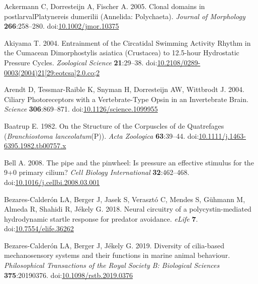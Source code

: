 \documentclass[
  11pt,
]{article}
\newlength{\cslhangindent}
\newenvironment{CSLReferences}[2] %
 {\begin{list}{}{%
  \setlength{\itemindent}{0pt}
  \setlength{\leftmargin}{0pt}
  \setlength{\parsep}{0pt}
  \ifodd #1
   \setlength{\leftmargin}{\cslhangindent}
   \setlength{\itemindent}{-1\cslhangindent}
  \fi
  \setlength{\itemsep}{#2\baselineskip}}}
 {\end{list}}
\begin{document}
\label{refs}
\begin{CSLReferences}{1}{0}
Ackermann C, Dorresteijn A, Fischer A. 2005. Clonal domains in
postlarvalPlatynereis dumerilii (Annelida: Polychaeta). \emph{Journal of
Morphology} \textbf{266}:258--280.
doi:\href{https://doi.org/10.1002/jmor.10375}{10.1002/jmor.10375}

Akiyama T. 2004. Entrainment of the Circatidal Swimming Activity Rhythm
in the Cumacean Dimorphostylis asiatica (Crustacea) to 12.5-hour
Hydrostatic Pressure Cycles. \emph{Zoological Science}
\textbf{21}:29--38.
doi:\href{https://doi.org/10.2108/0289-0003(2004)21\%5B29:eotcsa\%5D2.0.co;2}{10.2108/0289-0003(2004)21{[}29:eotcsa{]}2.0.co;2}

Arendt D, Tessmar-Raible K, Snyman H, Dorresteijn AW, Wittbrodt J. 2004.
Ciliary Photoreceptors with a Vertebrate-Type Opsin in an Invertebrate
Brain. \emph{Science} \textbf{306}:869--871.
doi:\href{https://doi.org/10.1126/science.1099955}{10.1126/science.1099955}

Baatrup E. 1982. On the Structure of the Corpuscles of de Quatrefages
({\emph{Branchiostoma lanceolatum}}(P)). \emph{Acta Zoologica}
\textbf{63}:39--44.
doi:\href{https://doi.org/10.1111/j.1463-6395.1982.tb00757.x}{10.1111/j.1463-6395.1982.tb00757.x}

Bell A. 2008. The pipe and the pinwheel: Is pressure an effective
stimulus for the 9+0 primary cilium? \emph{Cell Biology International}
\textbf{32}:462--468.
doi:\href{https://doi.org/10.1016/j.cellbi.2008.03.001}{10.1016/j.cellbi.2008.03.001}

Bezares-Calderón LA, Berger J, Jasek S, Verasztó C, Mendes S, Gühmann M,
Almeda R, Shahidi R, Jékely G. 2018. Neural circuitry of a
polycystin-mediated hydrodynamic startle response for predator
avoidance. \emph{eLife} \textbf{7}.
doi:\href{https://doi.org/10.7554/elife.36262}{10.7554/elife.36262}

Bezares-Calderón LA, Berger J, Jékely G. 2019. Diversity of cilia-based
mechanosensory systems and their functions in marine animal behaviour.
\emph{Philosophical Transactions of the Royal Society B: Biological
Sciences} \textbf{375}:20190376.
doi:\href{https://doi.org/10.1098/rstb.2019.0376}{10.1098/rstb.2019.0376}


\end{CSLReferences}
\end{document}
